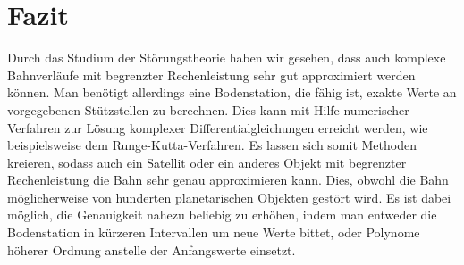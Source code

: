 \section{Fazit}
Durch das Studium der Störungstheorie haben wir gesehen, dass auch komplexe Bahnverläufe mit begrenzter Rechenleistung sehr gut approximiert werden können.
Man benötigt allerdings eine Bodenstation, die fähig ist, exakte Werte an vorgegebenen Stützstellen zu berechnen.
Dies kann mit Hilfe numerischer Verfahren zur Lösung komplexer Differentialgleichungen erreicht werden, wie beispielsweise dem Runge-Kutta-Verfahren.
Es lassen sich somit Methoden kreieren, sodass auch ein Satellit oder ein anderes Objekt mit begrenzter Rechenleistung die Bahn sehr genau approximieren kann.
Dies, obwohl die Bahn möglicherweise von hunderten planetarischen Objekten gestört wird.
Es ist dabei möglich, die Genauigkeit nahezu beliebig zu erhöhen, indem man entweder die Bodenstation in kürzeren Intervallen um neue Werte bittet,
oder Polynome höherer Ordnung anstelle der Anfangswerte einsetzt.
